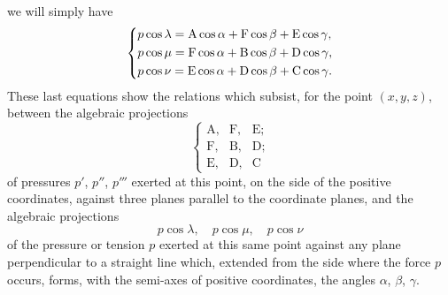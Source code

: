 \documentclass[leqno,openright,smallroyalvopaper,8pt,twoside,showtrims]{memoir}
\begin{document}
 we will simply have 
\begin{equation}\label{eq:matriz}
   \begin{dcases}
p\cos\lambda = \text{A}\cos\alpha+\text{F}\cos\beta+\text{E}\cos\gamma,\\
p\cos\mu = \text{F}\cos\alpha+\text{B}\cos\beta+\text{D}\cos\gamma,\\
p\cos\nu = \text{E}\cos\alpha+\text{D}\cos\beta+\text{C}\cos\gamma.
    \end{dcases}
 \end{equation}
These last equations show the relations which subsist, for the point $(x, y, z)$, between the algebraic projections
\begin{equation}\left\{
   \begin{array}{ccc}
\text{A}, & \text{F}, & \text{E};\\
\text{F}, & \text{B}, & \text{D};\\
\text{E}, & \text{D}, & \text{C}
    \end{array}\right.
 \end{equation}
 of pressures $p'$, $p''$, $p'''$ exerted at this point, on the side of the positive coordinates, against three planes parallel to the coordinate planes, and the algebraic projections
\begin{equation*}
p\cos\lambda,\quad p\cos\mu,\quad p\cos\nu
\end{equation*}
of the pressure or tension $p$ exerted at this same point against any plane perpendicular to a straight line which, extended from the side where the force $p$ occurs, forms, with the semi-axes of positive coordinates, the angles $\alpha$, $\beta$, $\gamma$. 
\end{document}
